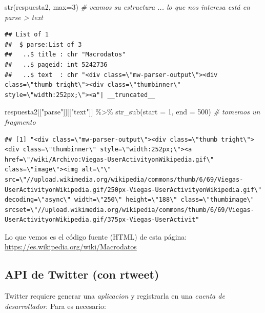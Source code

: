 \documentclass[
]{book}
\newenvironment{Shaded}{\begin{snugshade}}{\end{snugshade}}
\newcommand{\AttributeTok}[1]{\textcolor[rgb]{0.77,0.63,0.00}{#1}}
\newcommand{\CommentTok}[1]{\textcolor[rgb]{0.56,0.35,0.01}{\textit{#1}}}
\newcommand{\DecValTok}[1]{\textcolor[rgb]{0.00,0.00,0.81}{#1}}
\newcommand{\FunctionTok}[1]{\textcolor[rgb]{0.00,0.00,0.00}{#1}}
\newcommand{\NormalTok}[1]{#1}
\newcommand{\SpecialCharTok}[1]{\textcolor[rgb]{0.00,0.00,0.00}{#1}}
\newcommand{\StringTok}[1]{\textcolor[rgb]{0.31,0.60,0.02}{#1}}
\begin{document}
\begin{Shaded}
\begin{Highlighting}[]
\FunctionTok{str}\NormalTok{(respuesta2, }\AttributeTok{max=}\DecValTok{3}\NormalTok{) }\CommentTok{\# veamos su estructura ... lo que nos interesa está en parse \textgreater{} text}
\end{Highlighting}
\end{Shaded}

\begin{verbatim}
## List of 1
##  $ parse:List of 3
##   ..$ title : chr "Macrodatos"
##   ..$ pageid: int 5242736
##   ..$ text  : chr "<div class=\"mw-parser-output\"><div class=\"thumb tright\"><div class=\"thumbinner\" style=\"width:252px;\"><a"| __truncated__
\end{verbatim}

\begin{Shaded}
\begin{Highlighting}[]
\NormalTok{respuesta2[[}\StringTok{"parse"}\NormalTok{]][[}\StringTok{"text"}\NormalTok{]] }\SpecialCharTok{\%\textgreater{}\%} \FunctionTok{str\_sub}\NormalTok{(}\AttributeTok{start =} \DecValTok{1}\NormalTok{, }\AttributeTok{end =} \DecValTok{500}\NormalTok{) }\CommentTok{\# tomemos un fragmento}
\end{Highlighting}
\end{Shaded}

\begin{verbatim}
## [1] "<div class=\"mw-parser-output\"><div class=\"thumb tright\"><div class=\"thumbinner\" style=\"width:252px;\"><a href=\"/wiki/Archivo:Viegas-UserActivityonWikipedia.gif\" class=\"image\"><img alt=\"\" src=\"//upload.wikimedia.org/wikipedia/commons/thumb/6/69/Viegas-UserActivityonWikipedia.gif/250px-Viegas-UserActivityonWikipedia.gif\" decoding=\"async\" width=\"250\" height=\"188\" class=\"thumbimage\" srcset=\"//upload.wikimedia.org/wikipedia/commons/thumb/6/69/Viegas-UserActivityonWikipedia.gif/375px-Viegas-UserActivit"
\end{verbatim}

Lo que vemos es el código fuente (HTML) de esta página: \url{https://es.wikipedia.org/wiki/Macrodatos}

\hypertarget{api-de-twitter-con-rtweet}{%
\subsection{API de Twitter (con rtweet)}\label{api-de-twitter-con-rtweet}}

Twitter requiere generar una \emph{aplicacion} y registrarla en una \emph{cuenta de desarrollador}. Para es necesario:
\end{document}
